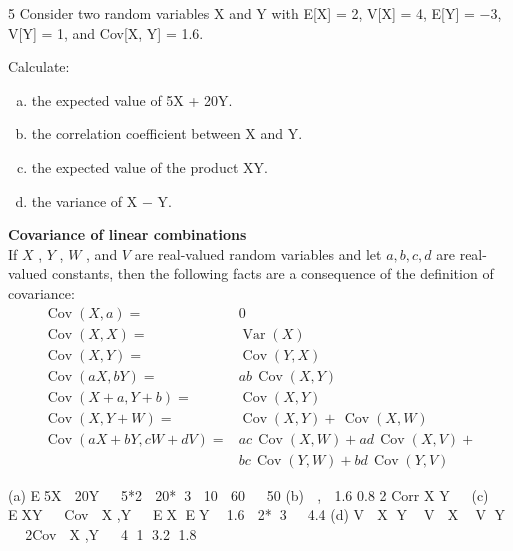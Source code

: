 \documentclass[a4paper,12pt]{article}
\begin{document}
5
Consider two random variables X and Y with E[X] = 2, V[X] = 4, E[Y] = −3, V[Y] = 1,
and Cov[X, Y] = 1.6.

Calculate:

\begin{enumerate}[(a)]
\item the expected value of 5X + 20Y.
\item the correlation coefficient between X and Y.
\item the expected value of the product XY.
\item the variance of X − Y.
\end{enumerate}

\begin{framed}
\noindent \textbf{Covariance of linear combinations}\\
If 
$ {\displaystyle X} $
, 
$ {\displaystyle Y} $
, 
$ {\displaystyle W} $
, and 
${\displaystyle V}$
 are real-valued random variables and let 
${\displaystyle a,b,c,d}$ are real-valued constants, then the following facts are a consequence of the definition of covariance: 
\[
{\displaystyle {\begin{aligned}\operatorname {Cov} (X,a) =&0\\\operatorname {Cov} (X,X)=&\operatorname {Var} (X)\\\operatorname {Cov} (X,Y)=&\operatorname {Cov} (Y,X)\\\operatorname {Cov} (aX,bY)=&ab\,\operatorname {Cov} (X,Y)\\\operatorname {Cov} (X+a,Y+b)=&\operatorname {Cov} (X,Y)\\
\operatorname {Cov} (X,Y+W)=&\operatorname {Cov} (X,Y) + \,\operatorname {Cov} (X,W) \\
\operatorname {Cov} (aX+bY,cW+dV)=&ac\,\operatorname {Cov} (X,W)+ad\,\operatorname {Cov} (X,V) + \\& bc\,\operatorname {Cov} (Y,W)+bd\,\operatorname {Cov} (Y,V)\end{aligned}}} 
\]
\end{framed}
 (a) E5X  20Y   5*2  20*3 10  60   50
(b)  ,  1.6 0.8
2
Corr X Y  
(c) EXY   Cov  X ,Y   EX EY  1.6  2*3  4.4
(d) V  X Y  V  X  V Y   2Cov  X ,Y   4 1 3.2 1.8

\end{document}
